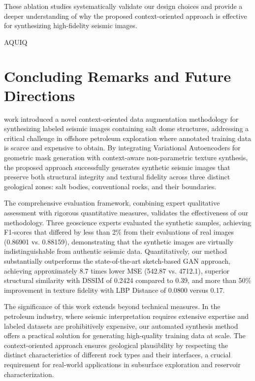 \documentclass{ieeeaccess}
\begin{document}
These ablation studies systematically validate our design choices and provide a deeper understanding of why the proposed context-oriented approach is effective for synthesizing high-fidelity seismic images.


AQUIQ

\section{Concluding Remarks and Future Directions}
\label{sec:conclusion}

 work introduced a novel context-oriented data augmentation methodology for synthesizing labeled seismic images containing salt dome structures, addressing a critical challenge in offshore petroleum exploration where annotated training data is scarce and expensive to obtain. By integrating Variational Autoencoders for geometric mask generation with context-aware non-parametric texture synthesis, the proposed approach successfully generates synthetic seismic images that preserve both structural integrity and textural fidelity across three distinct geological zones: salt bodies, conventional rocks, and their boundaries.

The comprehensive evaluation framework, combining expert qualitative assessment with rigorous quantitative measures, validates the effectiveness of our methodology. Three geoscience experts evaluated the synthetic samples, achieving F1-scores that differed by less than 2\% from their evaluations of real images (0.86901 vs. 0.88159), demonstrating that the synthetic images are virtually indistinguishable from authentic seismic data. Quantitatively, our method substantially outperforms the state-of-the-art sketch-based GAN approach, achieving approximately 8.7 times lower MSE (542.87 vs. 4712.1), superior structural similarity with DSSIM of 0.2424 compared to 0.39, and more than 50\% improvement in texture fidelity with LBP Distance of 0.0800 versus 0.17.

The significance of this work extends beyond technical measures. In the petroleum industry, where seismic interpretation requires extensive expertise and labeled datasets are prohibitively expensive, our automated synthesis method offers a practical solution for generating high-quality training data at scale. The context-oriented approach ensures geological plausibility by respecting the distinct characteristics of different rock types and their interfaces, a crucial requirement for real-world applications in subsurface exploration and reservoir characterization.
\end{document}
